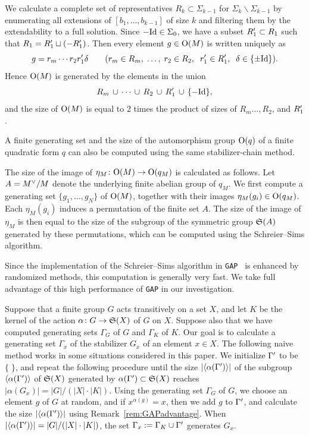 \documentclass{amsart} %
\begin{document}
We calculate a complete set of representatives
$R_k \subset \Sigma_{k-1}$ for $\Sigma_{k}\backslash\Sigma_{k-1}$
by enumerating all extensions of $[b_1, \dots, b_{k-1}]$ of size $k$
and filtering them by the extendability to a full solution.
Since $-\mathord{\mathrm{Id}}\in \Sigma_0$,
we have a subset $R_1^{\prime} \subset R_1$ such that
$R_1=R_1^{\prime}\sqcup (-R_1^{\prime})$.
Then every element $g\in \mathord{\mathrm{O}}(M)$ 
is written uniquely as 
\[
g=r_m \cdots r_2 r_1^{\prime} \delta \qquad
 (r_m\in R_m,\; \dots, \; r_2\in R_2, \;\; r_1^{\prime}\in R_1^{\prime},\;\; \delta\in \{\pm \mathord{\mathrm{Id}}\}).
\]
Hence $\mathord{\mathrm{O}}(M)$ is generated by the elements in the union 
\[
R_m\, \cup\, \cdots\, \cup \,R_2\,\cup\, R_1^{\prime}\,\cup\, \{- \mathord{\mathrm{Id}}\},
\]
and 
the size of $\mathord{\mathrm{O}}(M)$ is equal to $2$ times the product of sizes of $R_m\dots, R_2$, and $R_1^{\prime}$.
\par
A finite generating set and the size of the automorphism group $\mathord{\mathrm{O}}(q)$ of a finite quadratic form 
$q$ can also be computed using the same stabilizer-chain method.
\par
The size of the image of $\eta_M\colon \mathord{\mathrm{O}}(M)\to \mathord{\mathrm{O}}(q_M)$ is calculated as follows.
Let $A=M^{\vee}/M$ denote the underlying finite abelian group of $q_M$.
We first compute a generating set $\{g_1, \dots, g_N\}$ of $\mathord{\mathrm{O}}(M)$,
together with their images $\eta_M(g_i)\in \mathord{\mathrm{O}}(q_M)$.
Each $\eta_M(g_i)$ induces a permutation of the finite set $A$.
The size of the image of $\eta_M$ is 
then equal to the size of the subgroup of 
the symmetric group $\mathord{\mathfrak{S}}(A)$ generated by these permutations,
which can be computed using the Schreier--Sims algorithm.
%
\begin{remark}\label{rem:GAPadvantage}
Since the implementation of the Schreier--Sims algorithm in {\tt GAP}~\cite{GAP4} is enhanced by randomized methods,
this computation is generally very fast.
We take full advantage of this high performance of {\tt GAP} in our investigation.
\end{remark}
%
\begin{remark}\label{rem:gensofstab}
Suppose that a finite group $G$ acts transitively on a set $X$,
and let $K$ be the kernel of the action $\alpha\colon G\to \mathord{\mathfrak{S}}(X)$
 of $G$ on $X$.
Suppose also that we have computed generating sets $\Gamma_G$ of $G$ and 
 $\Gamma_K$ of $K$.
Our goal is to calculate a generating set $\Gamma_x$ of the stabilizer $G_x$ of 
an element $x\in X$.
The following naive method works in some situations considered in this paper.
We initialize $\Gamma^{\prime}$ to be $\{\;\}$,
and repeat the following procedure until
the size $| \langle {\alpha(\Gamma^{\prime})} \rangle|$ 
of the subgroup $\langle {\alpha(\Gamma^{\prime})} \rangle$ of $\mathord{\mathfrak{S}}(X)$ 
generated by $\alpha(\Gamma^{\prime}) \subset \mathord{\mathfrak{S}}(X)$
 reaches $|\alpha(G_x)|=|G|/(|X|\cdot |K|)$.
 Using the generating set $\Gamma_G$ of $G$, 
 we choose an element $g$ of $G$ at random, and 
if $x^{\alpha(g)}=x$, then we add $g$ to $\Gamma^{\prime}$, 
 and calculate the size $| \langle {\alpha(\Gamma^{\prime})} \rangle|$ using Remark~\ref{rem:GAPadvantage}.
 When $| \langle {\alpha(\Gamma^{\prime})} \rangle|=|G|/(|X|\cdot |K|)$, 
the set $\Gamma_x:=\Gamma_K\cup \Gamma^{\prime}$ generates $G_x$.
\end{remark}
%
%
%
\end{document}
